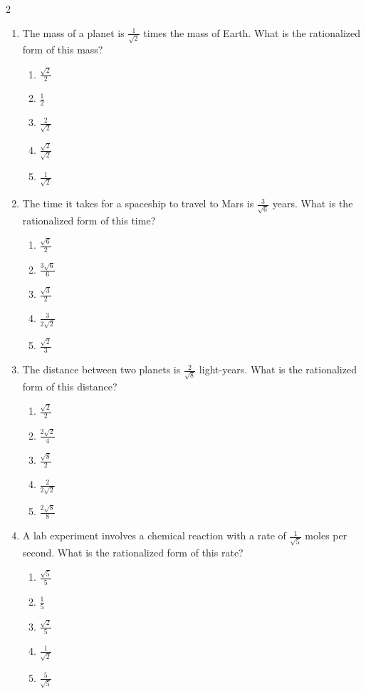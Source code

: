 \documentclass[10pt]{article}
\begin{document}
\begin{multicols}{2}
\begin{enumerate}[label=\textbf{Q\arabic*.}, leftmargin=*, itemsep=6pt, parsep=0pt]
  \item \small The mass of a planet is $\frac{1}{\sqrt{2}}$ times the mass of Earth. What is the rationalized form of this mass?
  \begin{enumerate}[label=(\Alph*), leftmargin=0.6cm, nosep, itemsep=2pt]
    \item $\frac{\sqrt{2}}{2}$
    \item $\frac{1}{2}$
    \item $\frac{2}{\sqrt{2}}$
    \item $\frac{\sqrt{2}}{\sqrt{2}}$
    \item $\frac{1}{\sqrt{2}}$
  \end{enumerate}

  \item \small The time it takes for a spaceship to travel to Mars is $\frac{3}{\sqrt{6}}$ years. What is the rationalized form of this time?
  \begin{enumerate}[label=(\Alph*), leftmargin=0.6cm, nosep, itemsep=2pt]
    \item $\frac{\sqrt{6}}{2}$
    \item $\frac{3\sqrt{6}}{6}$
    \item $\frac{\sqrt{3}}{2}$
    \item $\frac{3}{2\sqrt{2}}$
    \item $\frac{\sqrt{2}}{3}$
  \end{enumerate}

  \item \small The distance between two planets is $\frac{2}{\sqrt{8}}$ light-years. What is the rationalized form of this distance?
  \begin{enumerate}[label=(\Alph*), leftmargin=0.6cm, nosep, itemsep=2pt]
    \item $\frac{\sqrt{2}}{2}$
    \item $\frac{2\sqrt{2}}{4}$
    \item $\frac{\sqrt{8}}{2}$
    \item $\frac{2}{2\sqrt{2}}$
    \item $\frac{2\sqrt{8}}{8}$
  \end{enumerate}

  \item \small A lab experiment involves a chemical reaction with a rate of $\frac{1}{\sqrt{5}}$ moles per second. What is the rationalized form of this rate?
  \begin{enumerate}[label=(\Alph*), leftmargin=0.6cm, nosep, itemsep=2pt]
    \item $\frac{\sqrt{5}}{5}$
    \item $\frac{1}{5}$
    \item $\frac{\sqrt{2}}{5}$
    \item $\frac{1}{\sqrt{2}}$
    \item $\frac{5}{\sqrt{5}}$
  \end{enumerate}


\end{enumerate}
\end{multicols}
\end{document}
